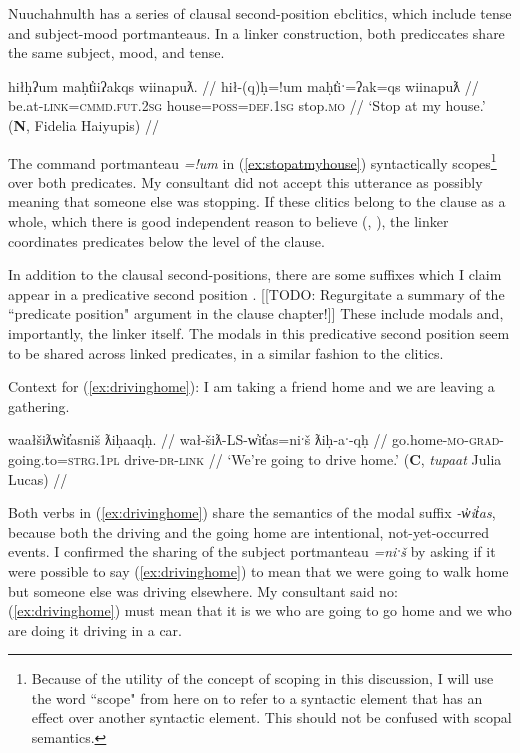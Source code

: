 Nuuchahnulth has a series of clausal second-position ebclitics, which include tense and subject-mood portmanteaus. In a linker construction, both prediccates share the same subject, mood, and tense.

\ex \label{ex:stopatmyhouse}
\begingl
\glpreamble hiłḥʔum maḥt̓iiʔakqs wiinapuƛ. //
\gla hił-(q)ḥ=!um maḥt̓iˑ=ʔak=qs wiinapuƛ //
\glb be.at-\textsc{link}=\textsc{cmmd.fut.2sg} house=\textsc{poss}=\textsc{def.1sg} stop.\textsc{mo} //
\glft `Stop at my house.' (\textbf{N}, Fidelia Haiyupis) //
\endgl
\xe

The command portmanteau \textit{=!um} in (\ref{ex:stopatmyhouse}) syntactically scopes\footnote{Because of the utility of the concept of scoping in this discussion, I will use the word ``scope" from here on to refer to a syntactic element that has an effect over another syntactic element. This should not be confused with scopal semantics.} over both predicates. My consultant did not accept this utterance as possibly meaning that someone else was stopping. If these clitics belong to the clause as a whole, which there is good independent reason to believe (\citealt[35--36]{rose1981}, \citealt[42--50]{woo2007b}), the linker coordinates predicates below the level of the clause.

In addition to the clausal second-positions, there are some suffixes which I claim appear in a predicative second position \citep{inman2018}. [[TODO: Regurgitate a summary of the ``predicate position" argument in the clause chapter!]] These include modals and, importantly, the linker itself. The modals in this predicative second position seem to be shared across linked predicates, in a similar fashion to the clitics.

\vspace{5pt}

\noindent Context for (\ref{ex:drivinghome}): I am taking a friend home and we are leaving a gathering.

\ex \label{ex:drivinghome}
\begingl
\glpreamble waałšiƛw̓it̓asniš ƛiḥaaqḥ. //
\gla wał-šiƛ-LS-w̓it̓as=niˑš ƛiḥ-aˑ-qḥ //
\glb go.home-\textsc{mo}-\textsc{grad}-going.to=\textsc{strg.1pl} drive-\textsc{dr}-\textsc{link} //
\glft `We're going to drive home.' (\textbf{C}, \textit{tupaat} Julia Lucas) //
\endgl
\xe

Both verbs in (\ref{ex:drivinghome}) share the semantics of the modal suffix \textit{-w̓it̓as}, because both the driving and the going home are intentional, not-yet-occurred events. I confirmed the sharing of the subject portmanteau \textit{=niˑš} by asking if it were possible to say (\ref{ex:drivinghome}) to mean that we were going to walk home but someone else was driving elsewhere. My consultant said no: (\ref{ex:drivinghome}) must mean that it is we who are going to go home and we who are doing it driving in a car.

